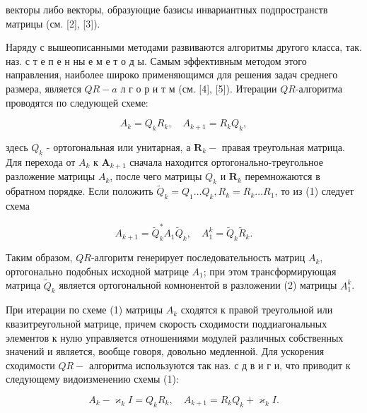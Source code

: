 \documentclass[10pt]{article}
\begin{document}
векторы либо векторы, образующие базисы инвариантных подпространств матрицы (см. [2], [3]).



Наряду с вышеописанными методами развиваются алгоритмы другого класса, так. наз. с т е п е н ны е м е т о д ы. Самым эффективным методом этого направления, наиболее широко применяющимся для решения задач среднего размера, является $Q R-a$ л г о р и т м (см. [4], [5]). Итерации $Q R$-алгоритма проводятся по следующей схеме:



\[

A_{k}=Q_{k} R_{k}, \quad A_{k+1}=R_{k} Q_{k},

\]



здесь $Q_{k}$ - ортогональная или унитарная, а $\boldsymbol{R}_{k}-$ правая треугольная матрица. Для перехода от $A_{k}$ к $\boldsymbol{A}_{k+1}$ сначала находится ортогонально-треугольное разложение матрицы $A_{k}$, после чего матрицы $Q_{k}$ и $\boldsymbol{R}_{k}$ перемножаются в обратном порядке. Если положить $\tilde{Q}_{k}=Q_{1} \ldots Q_{k}, R_{k}=R_{k} \ldots R_{1}$, то из (1) следует схема



\[

A_{k+1}=\tilde{Q}_{k}^{*} A_{1} \tilde{Q}_{k}, \quad A_{1}^{k}=\tilde{Q}_{k} \tilde{R}_{k} .

\]



Таким образом, $Q R$-алгоритм генерирует последовательность матриц $A_{k}$, ортогонально подобных исходной матрице $A_{1}$; при этом трансформирующая матрица $\tilde{Q}_{k}$ является ортогональной комнонентой в разложении (2) матрицы $A_{1}^{k}$.



При итерации по схеме (1) матрицы $A_{k}$ сходятся к правой треугольной или квазитреугольной матрице, причем скорость сходимости поддиагональных элементов к нулю управляется отношениями модулей различных собственных значений и является, вообще говоря, довольно медленной. Для ускорения сходимости $Q R-$ алгоритма используются так наз. с д в и г и, что приводит к следующему видоизменению схемы (1):



\[

A_{k}-\varkappa_{k} I=Q_{k} R_{k}, \quad A_{k+1}=R_{k} Q_{k}+\varkappa_{k} I .

\]
\end{document}
